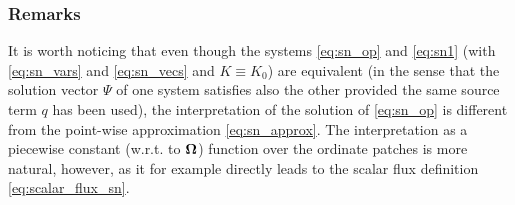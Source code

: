 \subsubsection{Remarks}\label{sec:remarks}
It is worth noticing that even though the systems \eqref{eq:sn_op}
and \eqref{eq:sn1} (with \eqref{eq:sn_vars} and \eqref{eq:sn_vecs} and $K \equiv K_0$) are equivalent (in the sense that
the solution vector $\Psi$ of one system satisfies also the other provided the same source term $q$ has been used), the
interpretation of the solution of \eqref{eq:sn_op} is different from the point-wise approximation \eqref{eq:sn_approx}. 
The interpretation as a piecewise constant (w.r.t. to $\mathbf{\Omega}$) function over the ordinate patches is more natural, 
however, as it for example directly leads to the scalar flux definition \eqref{eq:scalar_flux_sn}.

